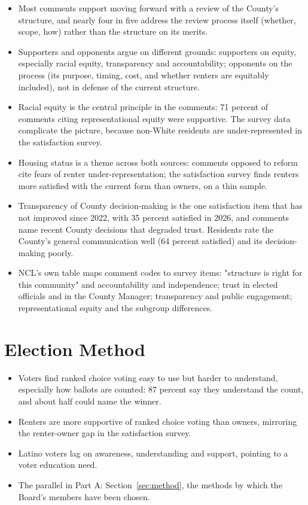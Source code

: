 \begin{itemize}
  \item Most comments support moving forward with a review of the County's
    structure, and nearly four in five address the review process itself
    (whether, scope, how) rather than the structure on its merits.
  \item Supporters and opponents argue on different grounds: supporters on
    equity, especially racial equity, transparency and accountability;
    opponents on the process (its purpose, timing, cost, and whether renters
    are equitably included), not in defense of the current structure.
  \item Racial equity is the central principle in the comments: 71 percent of
    comments citing representational equity were supportive. The survey data
    complicate the picture, because non-White residents are under-represented
    in the satisfaction survey.
  \item Housing status is a theme across both sources: comments opposed to
    reform cite fears of renter under-representation; the satisfaction survey
    finds renters more satisfied with the current form than owners, on a thin
    sample.
  \item Transparency of County decision-making is the one satisfaction item
    that has not improved since 2022, with 35 percent satisfied in 2026, and
    comments name recent County decisions that degraded trust. Residents rate
    the County's general communication well (64 percent satisfied) and its
    decision-making poorly.
  \item NCL's own table maps comment codes to survey items: "structure is right
    for this community" and accountability and independence; trust in elected
    officials and in the County Manager; transparency and public engagement;
    representational equity and the subgroup differences.
\end{itemize}

\section{Election Method}

\begin{itemize}
  \item Voters find ranked choice voting easy to use but harder to understand,
    especially how ballots are counted: 87 percent say they understand the
    count, and about half could name the winner.
  \item Renters are more supportive of ranked choice voting than owners,
    mirroring the renter-owner gap in the satisfaction survey.
  \item Latino voters lag on awareness, understanding and support, pointing to
    a voter education need.
  \item The parallel in Part A: Section~\ref{sec:method}, the methods by which
    the Board's members have been chosen.
\end{itemize}

